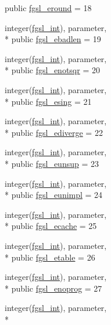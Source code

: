 \begin{DoxyCompactItemize}
public \hyperlink{classfgsl_a46f7428fe03a54ce95e47c21d299a129}{fgsl\-\_\-eround} = 18
\item 
integer(\hyperlink{classfgsl_a222deda1d7a0c0e845ce4a683318efeb}{fgsl\-\_\-int}), parameter, \\*
public \hyperlink{classfgsl_ac1f16c63f7a3d224fceb2113566856f5}{fgsl\-\_\-ebadlen} = 19
\item 
integer(\hyperlink{classfgsl_a222deda1d7a0c0e845ce4a683318efeb}{fgsl\-\_\-int}), parameter, \\*
public \hyperlink{classfgsl_a0ad3f5a5023fcd60f764cab3b2b07984}{fgsl\-\_\-enotsqr} = 20
\item 
integer(\hyperlink{classfgsl_a222deda1d7a0c0e845ce4a683318efeb}{fgsl\-\_\-int}), parameter, \\*
public \hyperlink{classfgsl_aeb4c28b199599ec4c17ff7330a4ad10d}{fgsl\-\_\-esing} = 21
\item 
integer(\hyperlink{classfgsl_a222deda1d7a0c0e845ce4a683318efeb}{fgsl\-\_\-int}), parameter, \\*
public \hyperlink{classfgsl_a955eb5c7585781ffb9e336843a471566}{fgsl\-\_\-ediverge} = 22
\item 
integer(\hyperlink{classfgsl_a222deda1d7a0c0e845ce4a683318efeb}{fgsl\-\_\-int}), parameter, \\*
public \hyperlink{classfgsl_af76528fed48ac5623d664d6e66e7ac1b}{fgsl\-\_\-eunsup} = 23
\item 
integer(\hyperlink{classfgsl_a222deda1d7a0c0e845ce4a683318efeb}{fgsl\-\_\-int}), parameter, \\*
public \hyperlink{classfgsl_a3a2e9a31e7f3fc209b5269b82d17117c}{fgsl\-\_\-eunimpl} = 24
\item 
integer(\hyperlink{classfgsl_a222deda1d7a0c0e845ce4a683318efeb}{fgsl\-\_\-int}), parameter, \\*
public \hyperlink{classfgsl_aa9ace1ec026e9acd65806d63c8b6e649}{fgsl\-\_\-ecache} = 25
\item 
integer(\hyperlink{classfgsl_a222deda1d7a0c0e845ce4a683318efeb}{fgsl\-\_\-int}), parameter, \\*
public \hyperlink{classfgsl_ac1348341f3d95b02f852466ca383d1ae}{fgsl\-\_\-etable} = 26
\item 
integer(\hyperlink{classfgsl_a222deda1d7a0c0e845ce4a683318efeb}{fgsl\-\_\-int}), parameter, \\*
public \hyperlink{classfgsl_a11266b4068f90334758a26d35c116f73}{fgsl\-\_\-enoprog} = 27
\item 
integer(\hyperlink{classfgsl_a222deda1d7a0c0e845ce4a683318efeb}{fgsl\-\_\-int}), parameter, \\*

\end{DoxyCompactItemize}
